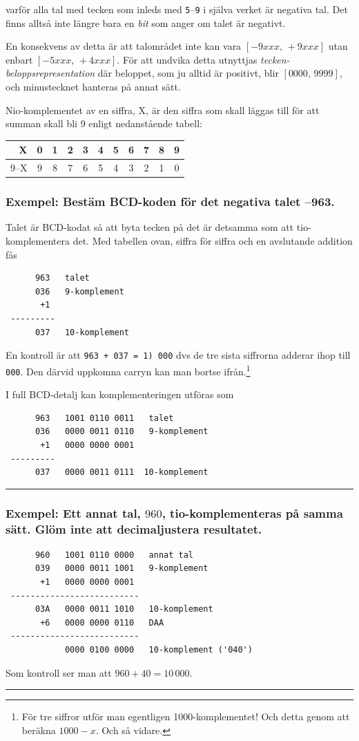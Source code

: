\documentclass[oneside,10pt,a4paper,swedish]{scrbook}
\newcommand{\startex}[1]{\subsubsection{Exempel: #1}}
\newcommand{\slutex}{\vspace{-8mm}\begin{flushright} \rule{1ex}{1ex} \end{flushright}}
\newcommand{\asm}[1]{\texttt{#1}}
\begin{document}
varför alla tal med tecken som inleds med \asm{5}--\asm{9} i själva verket är negativa tal. Det finns alltså inte längre bara en \emph{bit} som anger om talet är negativt.

En konsekvens av detta är att talområdet inte kan vara $\left[-9xxx,\,+9xxx\right]$ utan enbart $\left[-5xxx,\,+4xxx\right]$. För att undvika detta utnyttjas \emph{tecken-beloppsrepresentation} där beloppet, som ju alltid är positivt, blir $\left[0000,\,9999\right]$, och minustecknet hanteras på annat sätt.


Nio-komplementet av en siffra, X, är den siffra som skall läggas till för att summan skall bli 9 enligt nedanstående tabell:

\begin{center}
\begin{tabular}{r|cccccccccc|}
 X    & 0 & 1 & 2 & 3 & 4 & 5 & 6 & 7 & 8 & 9 \\
 \hline
 9--X & 9 & 8 & 7 & 6 & 5 & 4 & 3 & 2 & 1 & 0 \\
 \end{tabular}
\end{center}

\startex{Bestäm BCD-koden för det negativa talet --963.}

Talet är BCD-kodat så att byta tecken på det är detsamma som att tio-komplementera det. Med tabellen ovan, siffra för siffra och en avslutande addition fås


\begin{center}
\begin{lstlisting}
      963   talet
      036   9-komplement
       +1
 ---------
      037   10-komplement
\end{lstlisting}
\end{center}
En kontroll är att \asm{963 + 037 = 1) 000} dvs de tre sista siffrorna adderar ihop till \asm{000}. Den därvid uppkomna carryn kan man bortse ifrån.\footnote{För tre siffror utför man egentligen 1000-komplementet! Och detta genom att beräkna $1000 - x$. Och så vidare.} 


I full BCD-detalj kan komplementeringen utföras som 
\begin{center}
\begin{lstlisting}
      963   1001 0110 0011   talet
      036   0000 0011 0110   9-komplement
       +1   0000 0000 0001  
 ---------
      037   0000 0011 0111  10-komplement
\end{lstlisting}
\end{center}
\slutex

\startex{Ett annat tal, $960$, tio-komplementeras på samma sätt. Glöm inte att decimal\-justera resultatet.}
\begin{center}
\begin{lstlisting}
      960   1001 0110 0000   annat tal
      039   0000 0011 1001   9-komplement
       +1   0000 0000 0001  
 --------------------------
      03A   0000 0011 1010   10-komplement
       +6   0000 0000 0110   DAA
 --------------------------
            0000 0100 0000   10-komplement ('040')
\end{lstlisting}
\end{center}
Som kontroll ser man att $960 + 40 = 10\,000$.
\slutex
\end{document}
